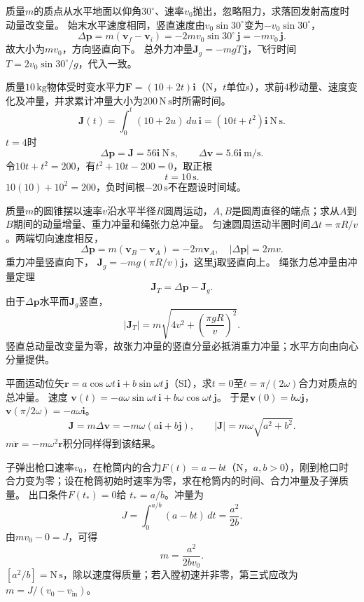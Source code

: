 \problemtext 质量$m$的质点从水平地面以仰角$30^\circ$、速率$v_0$抛出，忽略阻力，求落回发射高度时动量改变量。
\workings
始末水平速度相同，竖直速度由$v_0\sin30^\circ$变为$-v_0\sin30^\circ$，
\[
\Delta\bm p=m(\bm v_f-\bm v_i)
=-2mv_0\sin30^\circ\,\bm j
=\boxed{-mv_0\,\bm j}.
\]
故大小为$mv_0$，方向竖直向下。
\crosscheck 总外力冲量$\bm J_g=-mgT\,\bm j$，飞行时间$T=2v_0\sin30^\circ/g$，代入一致。

\problemtext 质量$10\,\mathrm{kg}$物体受时变水平力$\bm F=(10+2t)\bm i$（N，$t$单位s），求前$4$秒动量、速度变化及冲量，并求累计冲量大小为$200\,\mathrm{N\,s}$时所需时间。
\workings
\[
\bm J(t)=\int_0^t(10+2u)\,du\,\bm i
=(10t+t^2)\bm i\ \mathrm{N\,s}.
\]
$t=4$时
\[
\boxed{\Delta\bm p=\bm J=56\bm i\ \mathrm{N\,s}},
\qquad
\boxed{\Delta\bm v=5.6\bm i\ \mathrm{m/s}}.
\]
令$10t+t^2=200$，有$t^2+10t-200=0$，取正根
\[
\boxed{t=10\,\mathrm s}.
\]
\crosscheck $10(10)+10^2=200$，负时间根$-20\,\mathrm s$不在题设时间域。

\problemtext 质量$m$的圆锥摆以速率$v$沿水平半径$R$圆周运动，$A,B$是圆周直径的端点；求从$A$到$B$期间的动量增量、重力冲量和绳张力总冲量。
\workings
匀速圆周运动半圈时间$\Delta t=\pi R/v$。两端切向速度相反，
\[
\Delta\bm p=m(\bm v_B-\bm v_A)=-2m\bm v_A,
\quad |\Delta\bm p|=2mv.
\]
重力冲量竖直向下，
$\boxed{\bm J_g=-mg(\pi R/v)\bm j}$，这里$\bm j$取竖直向上。
绳张力总冲量由冲量定理
\[
\bm J_T=\Delta\bm p-\bm J_g.
\]
由于$\Delta\bm p$水平而$\bm J_g$竖直，
\[
\boxed{|\bm J_T|
=m\sqrt{4v^2+\left(\frac{\pi gR}{v}\right)^2}}.
\]
\crosscheck 竖直总动量改变量为零，故张力冲量的竖直分量必抵消重力冲量；水平方向由向心分量提供。

\problemtext 平面运动位矢$\bm r=a\cos\omega t\,\bm i+b\sin\omega t\,\bm j$（SI），求$t=0$至$t=\pi/(2\omega)$合力对质点的总冲量。
\workings
速度
$\bm v(t)=-a\omega\sin\omega t\,\bm i+
b\omega\cos\omega t\,\bm j$。
于是$\bm v(0)=b\omega\bm j$，$\bm v(\pi/2\omega)=-a\omega\bm i$。
\[
\boxed{\bm J=m\Delta\bm v=-m\omega(a\bm i+b\bm j)},
\qquad
\boxed{|\bm J|=m\omega\sqrt{a^2+b^2}}.
\]
\crosscheck $m\ddot{\bm r}=-m\omega^2\bm r$积分同样得到该结果。

\problemtext 子弹出枪口速率$v_0$，在枪筒内的合力$F(t)=a-bt$（N，$a,b>0$），刚到枪口时合力变为零；设在枪筒初始时速率为零，求在枪筒内的时间、合力冲量及子弹质量。
\workings
出口条件$F(t_*)=0$给
$\boxed{t_*=a/b}$。冲量为
\[
J=\int_0^{a/b}(a-bt)\,dt
=\boxed{\frac{a^2}{2b}}.
\]
由$mv_0-0=J$，可得
\[
\boxed{m=\frac{a^2}{2bv_0}}.
\]
\crosscheck $[a^2/b]=\mathrm{N\,s}$，除以速度得质量；若入膛初速并非零，第三式应改为$m=J/(v_0-v_{\mathrm{in}})$。

